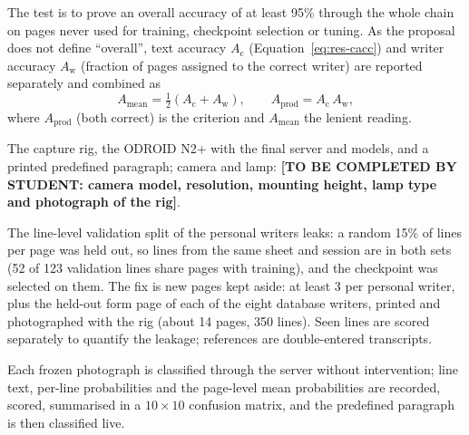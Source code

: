 
\medskip
\label{sec:res-qtp2}


            The test is to prove an overall accuracy of at least 95\% through the whole chain on pages never used for training, checkpoint selection or tuning.
            As the proposal does not define ``overall'', text accuracy $A_{\mathrm{c}}$ (Equation~\ref{eq:res-cacc}) and writer accuracy $A_{\mathrm{w}}$ (fraction of pages assigned to the correct writer) are reported separately and combined as
            \begin{equation}
            \label{eq:res-overall}
            A_{\mathrm{mean}}=\tfrac{1}{2}\left(A_{\mathrm{c}}+A_{\mathrm{w}}\right),\qquad A_{\mathrm{prod}}=A_{\mathrm{c}}\,A_{\mathrm{w}},
            \end{equation}
            where $A_{\mathrm{prod}}$ (both correct) is the criterion and $A_{\mathrm{mean}}$ the lenient reading.


            The capture rig, the ODROID N2+ with the final server and models, and a printed predefined paragraph; camera and lamp: \textbf{[TO BE COMPLETED BY STUDENT: camera model, resolution, mounting height, lamp type and photograph of the rig]}.


            The line-level validation split of the personal writers leaks: a random 15\% of lines per page was held out, so lines from the same sheet and session are in both sets (52 of 123 validation lines share pages with training), and the checkpoint was selected on them.
            The fix is new pages kept aside: at least 3 per personal writer, plus the held-out form page of each of the eight database writers, printed and photographed with the rig (about 14 pages, 350 lines).
            Seen lines are scored separately to quantify the leakage; references are double-entered transcripts.


            Each frozen photograph is classified through the server without intervention; line text, per-line probabilities and the page-level mean probabilities are recorded, scored, summarised in a $10\times10$ confusion matrix, and the predefined paragraph is then classified live.

